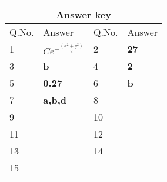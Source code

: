 \setlength\arrayrulewidth{1pt}
\begin{table}[H]
	\centering
	\begin{tabular}{|p{1.5cm}|p{1.5cm}||p{1.5cm}|p{1.5cm}|}
		\hline
		\multicolumn{4}{|c|}{\textbf{Answer key}}\\\hline\hline
		\rowcolor{ocrel}Q.No.&Answer&Q.No.&Answer\\\hline
		1&$C e^{-\frac{\left(x^{2}+y^{2}\right)}{2} }$ &2&\textbf{27}\\\hline 
		3&\textbf{b} &4&\textbf{2} \\\hline
		5&\textbf{0.27} &6&\textbf{b} \\\hline
		7&\textbf{a,b,d}&8&\textbf{}\\\hline
		9&\textbf{}&10&\textbf{}\\\hline
		11&\textbf{} &12&\textbf{}\\\hline
		13&\textbf{}&14&\textbf{}\\\hline
		15&\textbf{}& &\\\hline
		
	\end{tabular}
\end{table}
\pagestyle{empty}
\newpage

